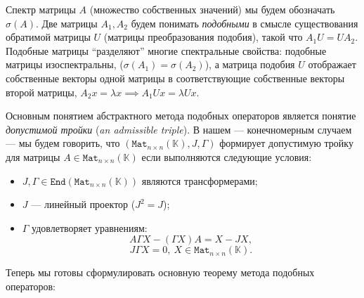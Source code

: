 \documentclass[14pt,a4paper]{extarticle}
\theoremstyle{definition}
\begin{document}
Спектр матрицы \( A \)
    (множество собственных значений)
    мы будем обозначать \( \sigma(A) \).
Две матрицы \( A_1, A_2 \) будем понимать \emph{подобными}
    в смысле существования обратимой матрицы \( U \)
    (матрицы преобразования подобия),
    такой что \( A_1 U = U A_2 \).
Подобные матрицы ``разделяют'' многие спектральные свойства:
    подобные матрицы изоспектральны, (\( \sigma(A_1) = \sigma(A_2) \)),
    а матрица подобия \( U \) отображает собственные векторы одной матрицы
    в соответствующие собственные векторы второй матрицы,
    \( A_2 x = \lambda x \implies A_1 U x = \lambda U x \).

Основным понятием абстрактного метода подобных операторов
является понятие \emph{допустимой тройки} (\emph{an admissible triple}).
В нашем --- конечномерным случаем --- мы будем говорить, что
    \( (\mathtt{Mat}_{n{\times}n}(\mathbb{K}), J, \Gamma) \)
    формирует допустимую тройку
    для матрицы \( A\in\mathtt{Mat}_{n{\times}n}(\mathbb{K}) \)
    если выполняются следующие условия:
\begin{itemize}
    \item \( J, \Gamma \in \mathtt{End}(\mathtt{Mat}_{n{\times}n}(\mathbb{K})) \)
      являются трансформерами;
    \item \( J \) --- линейный проектор (\( J^2 = J \));
    \item  \( \Gamma \) удовле\-творяет уравнениям:
        \[
            A \Gamma X - (\Gamma X) A = X - JX,
        \]
        \[
            J\Gamma X = 0,\ X\in\mathtt{Mat}_{n{\times}n}(\mathbb{K}).
        \]
\end{itemize}

Теперь мы готовы сформулировать основную теорему метода подобных операторов:
\end{document}
